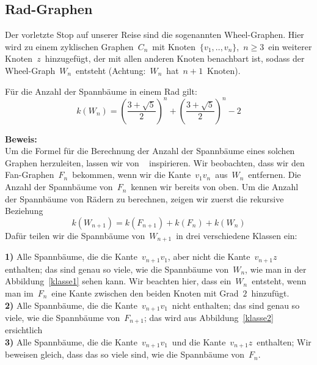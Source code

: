\subsection{Rad-Graphen}
Der vorletzte Stop auf unserer Reise sind die sogenannten Wheel-Graphen. Hier wird zu einem zyklischen Graphen $\,C_n\,$ mit Knoten $\,\{v_1,..,v_n\}$,\; $\,n \geq 3\,$ ein weiterer Knoten $\,z\,$ hinzugefügt, der mit allen anderen Knoten benachbart ist, sodass der Wheel-Graph $\,W_{n}\,$ entsteht (Achtung: $\,W_n\,$ hat $\,n+1\,$ Knoten).
\begin{Tm}
Für die Anzahl der Spannbäume in einem Rad gilt:
\begin{equation}
 \mathit{k}\left(W_n\right) = \left(\frac{3+\sqrt{5}}{2}\right)^n+\left(\frac{3+\sqrt{5}}{2}\right)^n-2
 \label{wn}
\end{equation}
\end{Tm}
\textbf{Beweis:}\\
Um die Formel für die Berechnung der Anzahl der Spannbäume eines solchen Graphen herzuleiten, lassen wir von ~\cite{sedlacek_1970} inspirieren.
Wir beobachten, dass wir den Fan-Graphen $\,F_n\,$ bekommen, wenn wir die Kante $\,v_1v_n\,$ aus $\,W_n\,$ entfernen.
Die Anzahl der Spannbäume von $\,F_n\,$ kennen wir bereits von oben.
Um die Anzahl der Spannbäume von Rädern zu berechnen, zeigen wir zuerst die rekursive Beziehung
\begin{equation}
 \mathit{k}\left(W_{n+1}\right) = \mathit{k}\left(F_{n+1}\right) + \mathit{k}\left(F_n\right) + \mathit{k}\left(W_n\right)
\end{equation}
Dafür teilen wir die Spannbäume von $\,W_{n+1}\,$ in drei verschiedene Klassen ein:\\
\par
\begingroup
\leftskip=20pt
\rightskip=20pt
\noindent
\textbf{1)} Alle Spannbäume, die die Kante $\,v_{n+1}v_1$,\; aber nicht die Kante $\,v_{n+1}z\,$ enthalten; das sind genau so viele, wie die Spannbäume von $\,W_n$,\; wie man in der Abbildung~\ref{klasse1} sehen kann. Wir beachten hier, dass ein $\,W_n\,$ entsteht, wenn man im $\,F_n\,$ eine Kante zwischen den beiden Knoten mit Grad $\,2\,$ hinzufügt.\\
\textbf{2)} Alle Spannbäume, die die Kante $\,v_{n+1}v_1\,$ nicht enthalten; das sind genau so viele, wie die Spannbäume von $\,F_{n+1}$; das wird aus Abbildung~\ref{klasse2} ersichtlich\\
\textbf{3)} Alle Spannbäume, die die Kante $\,v_{n+1}v_1\,$ und die Kante $\,v_{n+1}z\,$ enthalten; Wir beweisen gleich, dass das so viele sind, wie die Spannbäume von $\,F_n$.\; \\

